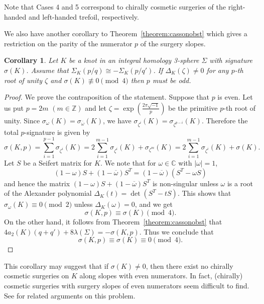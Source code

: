 \documentclass{amsart}
\newtheorem{corollary}[theorem]{Corollary}
\theoremstyle{remark}
\theoremstyle{definition}
\begin{document}
Note that Cases 4 and 5 correspond to chirally cosmetic surgeries of the right-handed and left-handed trefoil, respectively. 

We also have another corollary to Theorem~\ref{theorem:cassonobst} which gives a restriction on the parity of the numerator $p$ of the surgery slopes. 

\begin{corollary}
\label{cor:Casson2}
Let $K$ be a knot in an integral homology 3-sphere $\Sigma$ with signature $\sigma(K)$. 
Assume that $ \Sigma_{K}(p\slash q) \cong -\Sigma_{K}(p\slash q')$. 
If $\Delta_{K}(\zeta)\neq 0$ for any $p$-th root of unity $\zeta$ and 
 $\sigma(K) \not \equiv 0 \pmod 4$ then $p$ must be odd.
\end{corollary}

\begin{proof}
We prove the contraposition of the statement. 
Suppose that $p$ is even. 
Let us put $p=2m$ $(m \in \mathbb{Z})$ and let $\zeta = \exp(\frac{2\pi\sqrt{-1}}{p})$ be the primitive $p$-th root of unity.
Since $\sigma_{\omega}(K)=\sigma_{\overline{\omega}}(K)$, we have 
$\sigma_{\zeta^{i}}(K)=\sigma_{\zeta^{p-i}}(K)$. 
Therefore  the total $p$-signature is given by
\[\sigma(K,p)=\sum_{i=1}^{p-1} \sigma_{\zeta^{i}}(K) = 2\sum_{i=1}^{m-1} \sigma_{\zeta^{i}}(K) + \sigma_{\zeta^{m}}(K) = 2\sum_{i=1}^{m-1} \sigma_{\zeta^{i}}(K) + \sigma(K). \]
Let $S$ be a Seifert matrix for $K$. We note that for $\omega \in \mathbb{C}$ with $|\omega|=1$, 
\[(1-\omega)S + (1-\overline{\omega})S^{T}= (1-\overline{\omega})(S^{T}-\omega S)\] 
and hence the matrix $(1-\omega)S + (1-\overline{\omega})S^{T}$ is non-singular unless $\omega$ is a root 
of the Alexander polynomial $\Delta_{K}(t)=\det(S^{T}-tS)$. 
This shows that $\sigma_{\omega}(K) \equiv 0 \pmod 2$ unless $\Delta_{K}(\omega)=0$, and we get
\[ \sigma(K,p) \equiv \sigma(K) \pmod 4 .\]
On the other hand, it follows from Theorem~\ref{theorem:cassonobst} that 
$4a_{2}(K)(q+q')+8\lambda(\Sigma) = -\sigma(K,p)$.
Thus we conclude that 
\[ \sigma(K,p) \equiv \sigma(K) \equiv 0 \pmod 4.\]
\end{proof}

This corollary may suggest that if $\sigma(K) \neq 0$, then there exist no chirally cosmetic surgeries on $K$ along slopes with even numerators. 
In fact, (chirally) cosmetic surgeries with surgery slopes of even numerators seem difficult to find. See \cite{Ichihara} for related arguments on this problem. 
\end{document}
